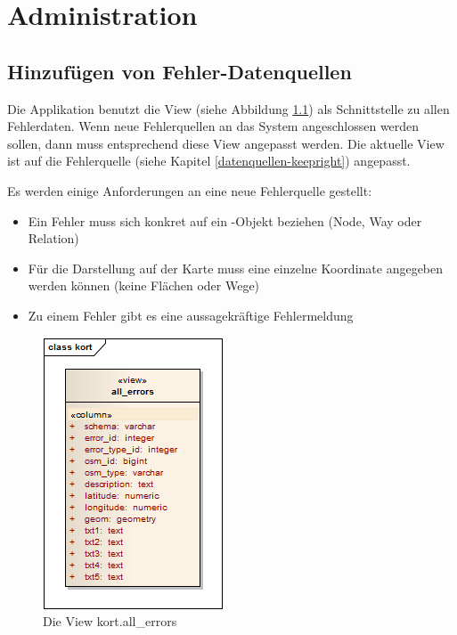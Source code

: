 \chapter{Administration}
\label{administration}

\section{Hinzufügen von Fehler-Datenquellen}
\label{additional-error-source}
Die Applikation benutzt die View  (siehe Abbildung \ref{image-kort-database-view-all_errors}) als Schnittstelle zu allen Fehlerdaten.
Wenn neue Fehlerquellen an das System angeschlossen werden sollen, dann muss entsprechend diese View angepasst werden.
Die aktuelle View ist auf die Fehlerquelle  (siehe Kapitel \ref{datenquellen-keepright}) angepasst.

Es werden einige Anforderungen an eine neue Fehlerquelle gestellt:
\begin{itemize}
\item Ein Fehler muss sich konkret auf ein -Objekt beziehen (\gls{Node}, \gls{Way} oder \gls{Relation})
\item Für die Darstellung auf der Karte muss eine einzelne Koordinate angegeben werden können (keine Flächen oder Wege)
\item Zu einem Fehler gibt es eine aussagekräftige Fehlermeldung
\end{itemize}

\begin{figure}[H]
	\centering
	\includegraphics[scale=0.7]{images/uml/kort-database-view-all_errors}
	\caption{Die View kort.all\_errors}
	\label{image-kort-database-view-all_errors}
\end{figure}

